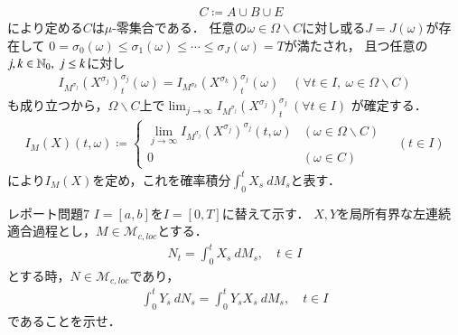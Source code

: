 \begin{prf}
\begin{description}
\begin{align}
					\quad C \coloneqq A \cup B \cup E
				\end{align}
				により定める$C$は$\mu$-零集合である．
				任意の$\omega \in \Omega \backslash C$に対し或る$J = J(\omega)$が存在して
				$0 = \sigma_0(\omega) \leq \sigma_1(\omega) \leq \cdots \leq \sigma_J(\omega) = T$が満たされ，
				且つ任意の$j,k \in \mathbb{N}_0,\ j \leq k$に対し
				\begin{align}
					I_{M^{\sigma_j}}(X^{\sigma_j})^{\sigma_j}_t(\omega) = I_{M^{\sigma_k}}(X^{\sigma_k})^{\sigma_j}_t(\omega)
					\quad (\forall t \in I,\ \omega \in \Omega \backslash C)
				\end{align}
				も成り立つから，$\Omega \backslash C$上で$\lim_{j \to \infty} I_{M^{\sigma_j}}(X^{\sigma_j})^{\sigma_j}_t\ (\forall t \in I)$
				が確定する．
				\begin{align}
					I_M(X)(t,\omega) \coloneqq 
					\begin{cases}
						\lim\limits_{j \to \infty} I_{M^{\sigma_j}}(X^{\sigma_j})^{\sigma_j}(t,\omega) & (\omega \in \Omega \backslash C) \\
						0 & (\omega \in C)
					\end{cases}
					\quad (t \in I)
					\label{eq:Ito-Integral_on_M_c_loc_limit}
				\end{align}
				により$I_M(X)$を定め，これを確率積分$\int_0^t X_s\ dM_s$と表す．
				\QED
		\end{description}
	\end{prf}
	
	\newpage
	\begin{itembox}[l]{レポート問題7}
		$I = [a,b]$を$I = [0,T]$に替えて示す．
		$X,Y$を局所有界な左連続適合過程とし，$M \in \mathcal{M}_{c,loc}$とする．
		\begin{align}
			N_t = \int_0^t X_s\ dM_s,
			\quad t \in I
		\end{align}
		とする時，$N \in \mathcal{M}_{c,loc}$であり，
		\begin{align}
			\int_0^t Y_s\ dN_s = \int_0^t Y_s X_s\ dM_s,
			\quad t \in I
			\label{eq:Ito-Integral_on_M_c_loc_report_7_0}
		\end{align}
		であることを示せ．
	\end{itembox}

